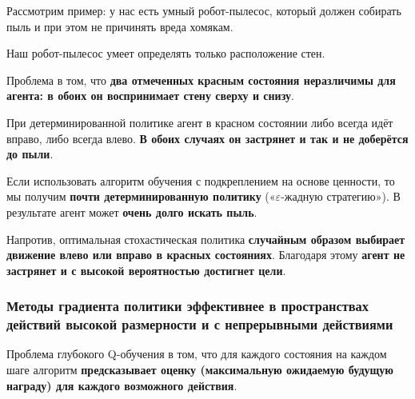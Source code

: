 \documentclass[11pt,a4paper]{article}
\begin{document}
Рассмотрим пример: у нас есть умный робот-пылесос, который должен собирать пыль и при этом не причинять вреда хомякам.


Наш робот-пылесос умеет определять только расположение стен.

Проблема в том, что \textbf{два отмеченных красным состояния неразличимы для агента: в обоих он воспринимает стену сверху и снизу}.


При детерминированной политике агент в красном состоянии либо всегда идёт вправо, либо всегда влево. \textbf{В обоих случаях он застрянет и так и не доберётся до пыли}.

Если использовать алгоритм обучения с подкреплением на основе ценности, то мы получим \textbf{почти детерминированную политику} («\(\varepsilon\)-жадную стратегию»). В результате агент может \textbf{очень долго искать пыль}.

Напротив, оптимальная стохастическая политика \textbf{случайным образом выбирает движение влево или вправо в красных состояниях}. Благодаря этому \textbf{агент не застрянет и с высокой вероятностью достигнет цели}.


\subsubsection{Методы градиента политики эффективнее в пространствах действий высокой размерности и с непрерывными действиями}\label{policy-gradient-methods-are-more-effective-in-high-dimensional-action-spaces-and-continuous-actions-spaces}

Проблема глубокого Q-обучения в том, что для каждого состояния на каждом шаге алгоритм \textbf{предсказывает оценку (максимальную ожидаемую будущую награду) для каждого возможного действия}.
\end{document}
